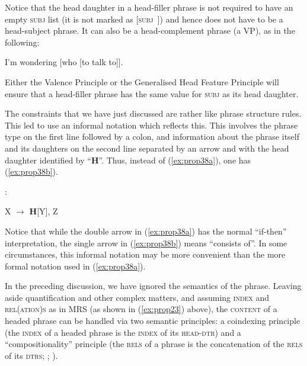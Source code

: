\documentclass[output=paper
	        ,collection
	        ,collectionchapter
 	        ,biblatex
                ,babelshorthands
                ,newtxmath
                ,draftmode
                ,colorlinks, citecolor=brown
]{langscibook}
\begin{document}
Notice that the head daughter in a head-filler phrase is not required to have an empty \textsc{subj} list (it is not marked as [\textsc{subj}~\eliste]) and hence does not have to be a head-subject phrase. It can also be a head-complement phrase (a VP), as in the following:

\ea\label{ex:prop37}
I’m wondering [who [to talk to]].
\z

\noindent
Either the Valence Principle or the Generalised Head Feature Principle will ensure that a head-filler phrase has the same value for \textsc{subj} as its head daughter.

The constraints that we have just discussed are rather like phrase structure rules. This led
\citet[33]{GSag2000a-u} to use an informal notation which reflects this. This involves the phrase
type on the first line followed by a colon, and information about the phrase itself and its
daughters on the second line separated by an arrow and with the head daughter identified by
``\textbf{H}''. Thus, instead of (\ref{ex:prop38a}), one has (\ref{ex:prop38b}). 

\eal\label{ex:prop38}
\ex\label{ex:prop38a}
 \impl
{}
\ex\label{ex:prop38b}
:
	
X $\to$ \textbf{H}[Y], Z
\zl

\noindent
Notice that while the double arrow in (\ref{ex:prop38a}) has the normal ``if-then'' interpretation, the single arrow in (\ref{ex:prop38b}) means ``consists of''. In some circumstances, this informal notation may be more convenient than the more formal notation used in (\ref{ex:prop38a}).

In the preceding discussion, we have ignored the semantics of the phrase. 
Leaving aside quantification and other complex matters, and assuming \textsc{index} and
\textsc{rel(ation)s} as in MRS (as shown in (\ref{ex:prop23}) above), the \textsc{content} of a
headed phrase can be handled via two semantic principles: a coindexing principle (the \textsc{index}
of a headed phrase is the \textsc{index} of its \textsc{head-dtr}) and a ``compositionality'' principle (the \textsc{rels} of
a phrase is the concatenation of the \textsc{rels} of its \textsc{dtrs}; \citealp[Section~4.3.2,
Section~5]{CFPS2005a}; ).
\end{document}
